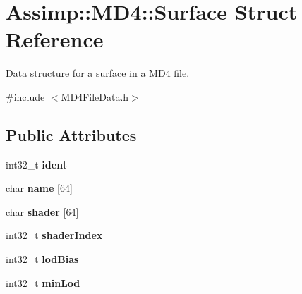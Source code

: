 \hypertarget{struct_assimp_1_1_m_d4_1_1_surface}{\section{Assimp\+:\+:M\+D4\+:\+:Surface Struct Reference}
\label{struct_assimp_1_1_m_d4_1_1_surface}
}


Data structure for a surface in a M\+D4 file.  




{\ttfamily \#include $<$M\+D4\+File\+Data.\+h$>$}

\subsection*{Public Attributes}
\begin{DoxyCompactItemize}
\item 
\hypertarget{struct_assimp_1_1_m_d4_1_1_surface_a5c5053c64c8969714e0687e4d7ebc8b3}{int32\+\_\+t {\bfseries ident}}\label{struct_assimp_1_1_m_d4_1_1_surface_a5c5053c64c8969714e0687e4d7ebc8b3}

\item 
\hypertarget{struct_assimp_1_1_m_d4_1_1_surface_a7d39ca69dd2e4e03fc55911e8f19c61a}{char {\bfseries name} \mbox{[}64\mbox{]}}\label{struct_assimp_1_1_m_d4_1_1_surface_a7d39ca69dd2e4e03fc55911e8f19c61a}

\item 
\hypertarget{struct_assimp_1_1_m_d4_1_1_surface_aa2d43d06b8732da81db9aae2e7de5135}{char {\bfseries shader} \mbox{[}64\mbox{]}}\label{struct_assimp_1_1_m_d4_1_1_surface_aa2d43d06b8732da81db9aae2e7de5135}

\item 
\hypertarget{struct_assimp_1_1_m_d4_1_1_surface_ac187e51620cbdee749d75569d507fa8e}{int32\+\_\+t {\bfseries shader\+Index}}\label{struct_assimp_1_1_m_d4_1_1_surface_ac187e51620cbdee749d75569d507fa8e}

\item 
\hypertarget{struct_assimp_1_1_m_d4_1_1_surface_ab85b4de90afb2ac492ab68e222b81c2f}{int32\+\_\+t {\bfseries lod\+Bias}}\label{struct_assimp_1_1_m_d4_1_1_surface_ab85b4de90afb2ac492ab68e222b81c2f}

\item 
\hypertarget{struct_assimp_1_1_m_d4_1_1_surface_a9c15f0b4392af9b5a34c78d3a612173b}{int32\+\_\+t {\bfseries min\+Lod}}\label{struct_assimp_1_1_m_d4_1_1_surface_a9c15f0b4392af9b5a34c78d3a612173b}


\end{DoxyCompactItemize}
